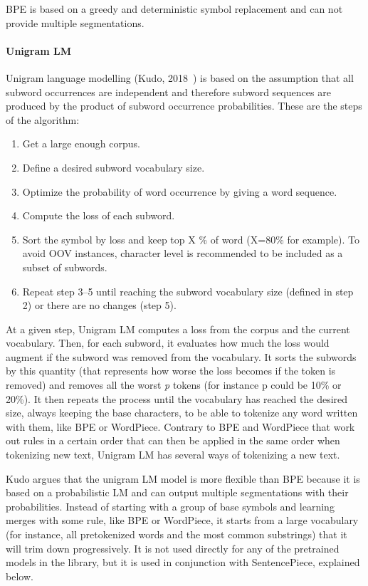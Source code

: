 BPE is based on a greedy and deterministic symbol replacement and can not provide multiple segmentations.

\paragraph{Unigram LM}\label{subsubsec:unigramlm}

Unigram language modelling (Kudo, 2018~\cite{kudo-2018-subword}) is based on the assumption that all subword occurrences are independent and therefore subword sequences are produced by the product of subword occurrence probabilities. These are the steps of the algorithm:

\begin{enumerate}
    \item Get a large enough corpus.
    \item Define a desired subword vocabulary size.
    \item Optimize the probability of word occurrence by giving a word sequence.
    \item Compute the loss of each subword.
    \item Sort the symbol by loss and keep top X \% of word (X=80\% for example). To avoid OOV instances, character level is recommended to be included as a subset of subwords.
    \item Repeat step 3–5 until reaching the subword vocabulary size (defined in step 2) or there are no changes (step 5).
\end{enumerate}

At a given step, Unigram LM computes a loss from the corpus and the current vocabulary. Then, for each subword, it evaluates how much the loss would augment if the subword was removed from the vocabulary. It sorts the subwords by this quantity (that represents how worse the loss becomes if the token is removed) and removes all the worst \emph{p} tokens (for instance p could be 10\% or 20\%). It then repeats the process until the vocabulary has reached the desired size, always keeping the base characters, to be able to tokenize any word written with them, like BPE or WordPiece. Contrary to BPE and WordPiece that work out rules in a certain order that can then be applied in the same order when tokenizing new text, Unigram LM has several ways of tokenizing a new text. 

Kudo argues that the unigram LM model is more flexible than BPE because it is based on a probabilistic LM and can output multiple segmentations with their probabilities. Instead of starting with a group of base symbols and learning merges with some rule, like BPE or WordPiece, it starts from a large vocabulary (for instance, all pretokenized words and the most common substrings) that it will trim down progressively. It is not used directly for any of the pretrained models in the library, but it is used in conjunction with SentencePiece, explained below.

